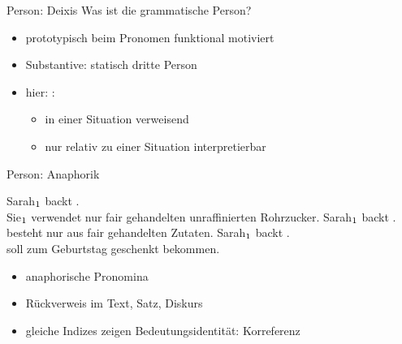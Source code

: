 \begin{frame}
  {Person: Deixis}
  \pause
  Was ist die grammatische Person?

  \Halbzeile
  \pause
  \begin{exe}
    \ex
    \begin{xlist}
      \pause
      \pause
      \pause
    \end{xlist}
  \end{exe}
  \pause
  \Halbzeile
  \begin{itemize}[<+->]
    \item prototypisch beim \alert{Pronomen} funktional motiviert
    \item Substantive: statisch dritte Person
      \Halbzeile
    \item hier: :
      \begin{itemize}[<+->]
        \item in einer Situation verweisend
        \item nur relativ zu einer Situation interpretierbar
      \end{itemize} 
  \end{itemize}
\end{frame}

\begin{frame}
  {Person: Anaphorik}
  \pause
  \begin{exe}
    \ex \alert{Sarah$_{\textnormal{1}}$} backt  .\\
      \alert{Sie$_{\textnormal{1}}$} verwendet nur fair gehandelten unraffinierten Rohrzucker.
    \pause
      \ex \alert{Sarah$_{\textnormal{1}}$} backt  .\\
       besteht nur aus fair gehandelten Zutaten.
    \pause
      \ex \alert{Sarah$_{\textnormal{1}}$} backt  .\\
       soll  zum Geburtstag geschenkt bekommen.
  \end{exe}
  \Halbzeile
  \pause
  \begin{itemize}[<+->]
    \item anaphorische Pronomina
    \item Rückverweis im Text, Satz, Diskurs
    \item gleiche Indizes zeigen Bedeutungsidentität: Korreferenz
  \end{itemize}
\end{frame}

